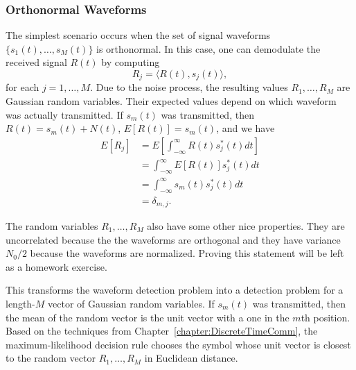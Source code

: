 \subsubsection{Orthonormal Waveforms}
The simplest scenario occurs when the set of signal waveforms $\{ s_1 (t), \ldots , s_M (t) \}$ is orthonormal.
In this case, one can demodulate the received signal $R(t)$ by computing
\[ R_j = \langle R(t), s_j (t) \rangle, \]
for each $j=1,\ldots,M$.
Due to the noise process, the resulting values $R_1 , \ldots, R_M$ are Gaussian random variables.
Their expected values depend on which waveform was actually transmitted.
If $s_m (t)$ was transmitted, then $R(t) = s_m(t) + N(t)$, $E[R(t)] = s_m(t)$, and we have
\begin{align*}
E \left[R_j \right]
&= E \left[ \int_{-\infty}^{\infty} R(t) s_j^* (t) dt \right] \\
&= \int_{-\infty}^{\infty} E \left[ R(t) \right] s_j^* (t) dt \\
&= \int_{-\infty}^{\infty} s_m (t) s_j^* (t) dt \\
&= \delta_{m,j}.
\end{align*}

The random variables $R_1, \ldots , R_M$ also have some other nice properties.
They are uncorrelated because the the waveforms are orthogonal and they have variance $N_0  / 2$ because the waveforms are normalized.
Proving this statement will be left as a homework exercise.

This transforms the waveform detection problem into a detection problem for a length-$M$ vector of Gaussian random variables.
If $s_m (t)$ was transmitted, then the mean of the random vector is the unit vector with a one in the $m$th position.
Based on the techniques from Chapter~\ref{chapter:DiscreteTimeComm}, the maximum-likelihood decision rule chooses the symbol whose unit vector is closest to the random vector $R_1,\ldots,R_M$ in Euclidean distance.

